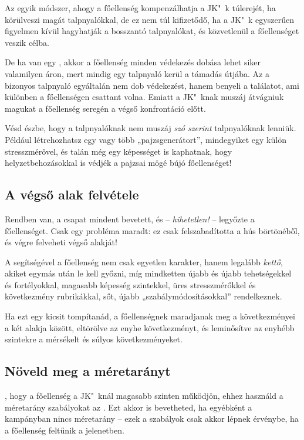 Az egyik módszer, ahogy a főellenség kompenzálhatja a JK"~k túlerejét, ha körülveszi magát talpnyalókkal, de ez nem túl kifizetődő, ha a JK"~k egyszerűen figyelmen kívül hagyhatják a bosszantó talpnyalókat, és közvetlenül a főellenséget veszik célba.

De ha van egy , akkor a főellenség minden védekezés dobása lehet siker valamilyen áron, mert mindig egy talpnyaló kerül a támadás útjába. Az a bizonyos talpnyaló egyáltalán nem dob védekezést, hanem benyeli a találatot, ami különben a főellenségen csattant volna. Emiatt a JK"~knak muszáj átvágniuk magukat a főellenség seregén a végső konfrontáció előtt.

Vésd észbe, hogy a talpnyalóknak nem muszáj \emph{szó szerint} talpnyalóknak lenniük. Például létrehozhatsz egy vagy több „pajzsgenerátort”, mindegyiket egy külön stresszmérővel, és talán még egy képességet is kaphatnak, hogy helyzetbehozásokkal is védjék a pajzsai mögé bújó főellenséget!

\newpage

\subsection{A végső alak felvétele}

Rendben van, a csapat mindent bevetett, és – \emph{hihetetlen!} – legyőzte a főellenséget. Csak egy probléma maradt: ez csak felszabadította a hús börtönéből, és végre felveheti végső alakját!

A  segítségével a főellenség nem csak egyetlen karakter, hanem legalább \emph{kettő}, akiket egymás után le kell győzni, míg mindketten újabb és újabb tehetségekkel és fortélyokkal, magasabb képesség szintekkel, üres stresszmérőkkel és következmény rubrikákkal, sőt, újabb „szabálymódosításokkal” rendelkeznek.

Ha ezt egy kicsit tompítanád, a főellenségnek maradjanak meg a következményei a két alakja között, eltörölve az enyhe következményt, és leminősítve az enyhébb szintekre a mérsékelt és súlyos következményeket.

\subsection{Növeld meg a méretarányt}

, hogy a főellenség a JK"~knál magasabb szinten működjön, ehhez használd a méretarány szabályokat az . Ezt akkor is bevetheted, ha egyébként a kampányban nincs méretarány – ezek a szabályok csak akkor lépnek érvénybe, ha a főellenség feltűnik a jelenetben.

